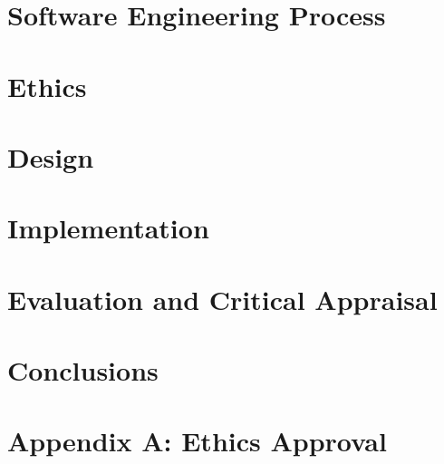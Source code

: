 \documentclass{article}
\begin{document}
\section{Software Engineering Process}


\section{Ethics}


\section{Design}


\section{Implementation}


\section{Evaluation and Critical Appraisal}


\section{Conclusions}


\newpage

\nocite{*}
\printbibliography

\appendix
\newpage
%

%

\section{Appendix A: Ethics Approval}

\end{document}
